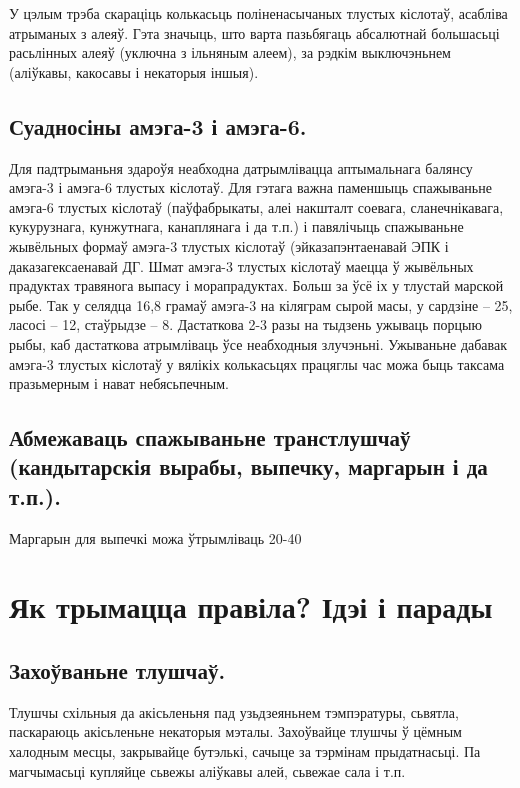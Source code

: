 У цэлым трэба скараціць колькасьць поліненасычаных тлустых кіслотаў, асабліва атрыманых з алеяў. Гэта значыць, што варта пазьбягаць абсалютнай большасьці расьлінных алеяў (уключна з ільняным алеем), за рэдкім выключэньнем (аліўкавы, какосавы і некаторыя іншыя).

\subsection{Суадносіны амэга-3 і амэга-6.}
Для падтрыманьня здароўя неабходна датрымлівацца аптымальнага балянсу амэга-3 і амэга-6 тлустых кіслотаў. Для гэтага важна паменшыць спажываньне амэга-6 тлустых кіслотаў (паўфабрыкаты, алеі накшталт соевага, сланечнікавага, кукурузнага, кунжутнага, канаплянага і да т.п.) і павялічыць спажываньне жывёльных формаў амэга-3 тлустых кіслотаў (эйказапэнтаенавай ЭПК і даказагексаенавай ДГ. Шмат амэга-3 тлустых кіслотаў маецца ў жывёльных прадуктах травянога выпасу і морапрадуктах. Больш за ўсё іх у тлустай марской рыбе. Так у селядца 16,8 грамаў амэга-3 на кіляграм сырой масы, у сардзіне – 25, ласосі – 12, стаўрыдзе – 8. Дастаткова 2-3 разы на тыдзень ужываць порцыю рыбы, каб дастаткова атрымліваць ўсе неабходныя злучэньні. Ужываньне дабавак амэга-3 тлустых кіслотаў у вялікіх колькасьцях працяглы час можа быць таксама празьмерным і нават небясьпечным.

\subsection{Абмежаваць спажываньне транстлушчаў (кандытарскія вырабы, выпечку, маргарын і да т.п.).}
Маргарын для выпечкі можа ўтрымліваць 20-40%

\section{Як трымацца правіла? Ідэі і парады}

\subsection{Захоўваньне тлушчаў.}
Тлушчы схільныя да акісьленьня пад узьдзеяньнем тэмпэратуры, сьвятла, паскараюць акісьленьне некаторыя мэталы. Захоўвайце тлушчы ў цёмным халодным месцы, закрывайце бутэлькі, сачыце за тэрмінам прыдатнасьці. Па магчымасьці купляйце сьвежы аліўкавы алей, сьвежае сала і т.п.


